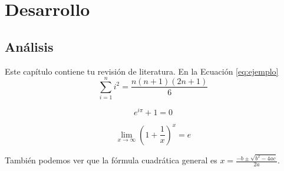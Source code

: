 \chapter{Desarrollo}
\section{Análisis}
Este capítulo contiene tu revisión de literatura. En la Ecuación \ref{eq:ejemplo}
\begin{equation}
  \sum_{i=1}^{n} i^2 = \frac{n(n+1)(2n+1)}{6}
\end{equation}

\begin{equation}
  e^{i\pi} + 1 = 0
\end{equation}

\begin{equation}
  \lim_{x \to \infty} \left(1 + \frac{1}{x}\right)^x = e
  \label{eq:ejemplo}
\end{equation}

También podemos ver que la fórmula cuadrática general es $x = \frac{-b \pm \sqrt{b^2 - 4ac}}{2a}$.